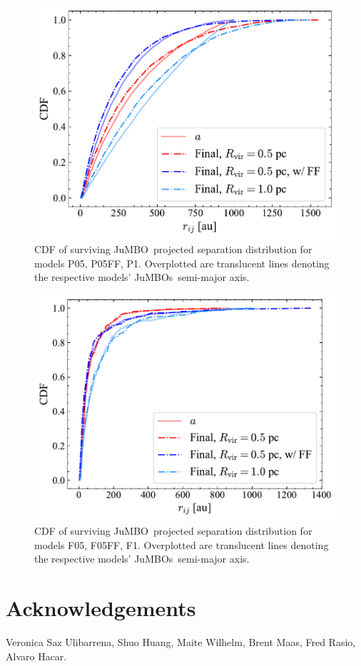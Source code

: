 \documentclass[aa]{lib/aa}
\newcommand{\jumbo}{\mbox{JuMBO}}
\newcommand{\jumbos}{\mbox{JuMBOs}}
\begin{document}
\begin{appendix}
    \begin{figure}
    \centering
        \includegraphics[width=\columnwidth]{figures/Plummer_General_proj_sep.pdf}
        \caption{CDF of surviving \jumbo\, projected separation distribution for models P05, P05FF, P1. Overplotted are translucent lines denoting the respective models' \jumbos\, semi-major axis.}
         \label{Fig:Plummer_rsep}
   \end{figure}
   \begin{figure}
    \centering
        \includegraphics[width=\columnwidth]{figures/Fractal_General_proj_sep.pdf}
        \caption{CDF of surviving \jumbo\, projected separation distribution for models F05, F05FF, F1. Overplotted are translucent lines denoting the respective models' \jumbos\, semi-major axis.}
         \label{Fig:Fractal_rsep}
   \end{figure}
\end{appendix}


\section*{Acknowledgements}

Veronica Saz Ulibarrena, Shuo Huang, Maite Wilhelm, Brent Maas,
Fred Rasio, Alvaro Hacar.
    

    
\end{document}
